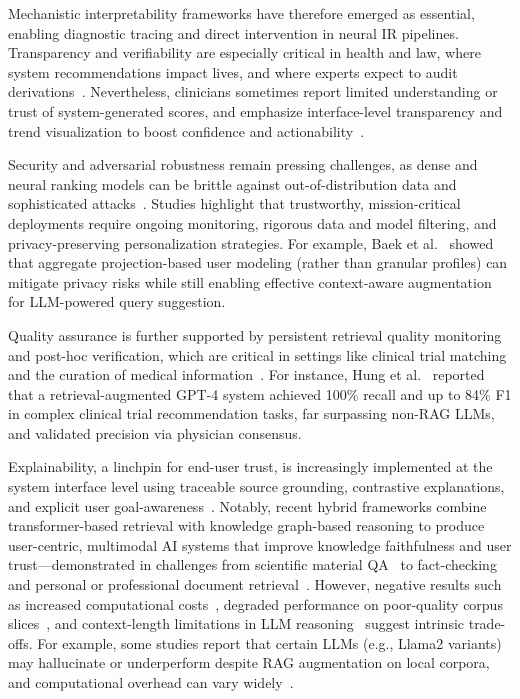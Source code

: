 \documentclass[sigconf]{acmart}
\begin{document}
Mechanistic interpretability frameworks have therefore emerged as essential, enabling diagnostic tracing and direct intervention in neural IR pipelines. Transparency and verifiability are especially critical in health and law, where system recommendations impact lives, and where experts expect to audit derivations~\cite{ref33:2024,ref34:2023,ref53:2024,ref5:2025,ref2:2025}. Nevertheless, clinicians sometimes report limited understanding or trust of system-generated scores, and emphasize interface-level transparency and trend visualization to boost confidence and actionability~\cite{ref50:2024}.

Security and adversarial robustness remain pressing challenges, as dense and neural ranking models can be brittle against out-of-distribution data and sophisticated attacks~\cite{ref2:2025,ref7:2025,ref37:2023,ref49:2025,ref51:2024,ref55:2024,ref61:2023,ref62:2017}. Studies highlight that trustworthy, mission-critical deployments require ongoing monitoring, rigorous data and model filtering, and privacy-preserving personalization strategies. For example, Baek et al.~\cite{ref36:2024} showed that aggregate projection-based user modeling (rather than granular profiles) can mitigate privacy risks while still enabling effective context-aware augmentation for LLM-powered query suggestion.

Quality assurance is further supported by persistent retrieval quality monitoring and post-hoc verification, which are critical in settings like clinical trial matching and the curation of medical information~\cite{ref48:2024,ref53:2024}. For instance, Hung et al.~\cite{ref53:2024} reported that a retrieval-augmented GPT-4 system achieved 100\% recall and up to 84\% F1 in complex clinical trial recommendation tasks, far surpassing non-RAG LLMs, and validated precision via physician consensus.

Explainability, a linchpin for end-user trust, is increasingly implemented at the system interface level using traceable source grounding, contrastive explanations, and explicit user goal-awareness~\cite{ref17:2019,ref24:2016,ref29:2025,ref36:2024,ref37:2023,ref39:2025,ref40:2019,ref43:2021,ref54:2025}. Notably, recent hybrid frameworks combine transformer-based retrieval with knowledge graph-based reasoning to produce user-centric, multimodal AI systems that improve knowledge faithfulness and user trust—demonstrated in challenges from scientific material QA~\cite{ref29:2025} to fact-checking and personal or professional document retrieval~\cite{ref17:2019,ref36:2024,ref39:2025,ref40:2019,ref54:2025}. However, negative results such as increased computational costs~\cite{ref2:2025}, degraded performance on poor-quality corpus slices~\cite{ref54:2025,ref48:2024}, and context-length limitations in LLM reasoning~\cite{ref49:2025} suggest intrinsic trade-offs. For example, some studies report that certain LLMs (e.g., Llama2 variants) may hallucinate or underperform despite RAG augmentation on local corpora, and computational overhead can vary widely~\cite{ref2:2025}.
\end{document}
